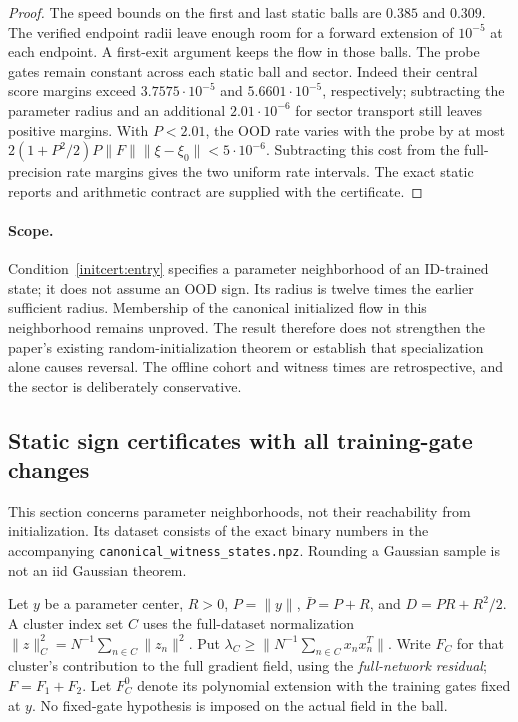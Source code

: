 \begin{proof}
The speed bounds on the first and last static balls are $0.385$ and
$0.309$. The verified endpoint radii leave enough room for a forward
extension of $10^{-5}$ at each endpoint. A first-exit argument keeps the
flow in those balls. The probe gates remain constant across each static
ball and sector. Indeed their central score margins exceed
$3.7575\cdot10^{-5}$ and $5.6601\cdot10^{-5}$, respectively;
subtracting the parameter radius and an additional $2.01\cdot10^{-6}$
for sector transport still leaves positive margins.
With $P<2.01$, the OOD rate varies with the probe by at most
$2(1+P^2/2)P\|F\|\|\xi-\xi_0\|<5\cdot10^{-6}$.
Subtracting this cost from the full-precision rate margins gives the two
uniform rate intervals. The exact static reports and arithmetic contract
are supplied with the certificate.
\end{proof}

\paragraph{Scope.}
Condition~\eqref{initcert:entry} specifies a parameter neighborhood of an
ID-trained state; it does not assume an OOD sign. Its radius is twelve times
the earlier sufficient radius. Membership of the canonical initialized flow
in this neighborhood remains unproved. The result therefore does not
strengthen the paper's existing random-initialization theorem or establish
that specialization alone causes reversal. The offline cohort and witness
times are retrospective, and the sector is deliberately conservative.

\subsection{Static sign certificates with all training-gate changes}
\label{initcert:static}
This section concerns parameter neighborhoods, not their reachability from
initialization. Its dataset consists of the exact binary numbers in the
accompanying \texttt{canonical\_witness\_states.npz}. Rounding a Gaussian
sample is not an iid Gaussian theorem.

Let $y$ be a parameter center, $R>0$, $P=\|y\|$, $\bar P=P+R$, and
$D=PR+R^2/2$. A cluster index set $C$ uses the full-dataset normalization
$\|z\|_C^2=N^{-1}\sum_{n\in C}\|z_n\|^2$. Put
$\lambda_C\ge\|N^{-1}\sum_{n\in C}x_nx_n^T\|$.
Write $F_C$ for that cluster's contribution to the full gradient field,
using the \emph{full-network residual}; $F=F_1+F_2$.
Let $F_C^0$ denote its polynomial extension with the training gates fixed
at $y$. No fixed-gate hypothesis is imposed on the actual field in the ball.

